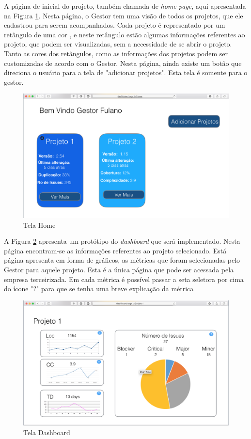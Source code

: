 A página de inicial do projeto, também chamada de \textit{home page}, aqui apresentada na Figura \ref{img:telaHome}. Nesta página, o Gestor tem uma visão de todos os projetos, que ele cadastrou para serem acompanhados. Cada projeto é representado por um retângulo de uma cor , e neste retângulo estão algumas informações referentes ao projeto, que podem ser visualizadas, sem a necessidade de se abrir o projeto. Tanto as cores dos retângulos, como as informações dos projetos podem ser customizadas de acordo com o Gestor. Nesta página, ainda existe um botão que direciona o usuário para a tela de "adicionar projetos". Esta tela é somente para o gestor.
 
\graphicspath{{figuras/}}
\begin{figure}[H]
\centering
\includegraphics[scale=0.60]{telaHome2.png}
\caption{Tela Home}
\label{img:telaHome}
\end{figure} 

A Figura \ref{img:telaDashboard} apresenta um protótipo do \textit{dashboard} que será implementado. Nesta página encontram-se as informações referentes ao projeto selecionado. Está página apresenta em forma de gráficos, as métricas que foram selecionadas pelo Gestor para aquele projeto. Esta é a única página que pode ser acessada pela empresa terceirizada. Em cada métrica é possível passar a seta seletora por cima do ícone "?" para que se tenha uma breve explicação da métrica 

\graphicspath{{figuras/}}
\begin{figure}
\centering
\includegraphics[scale=0.60]{telaDashboard.png}
\caption{Tela Dashboard}
\label{img:telaDashboard}
\end{figure} 

